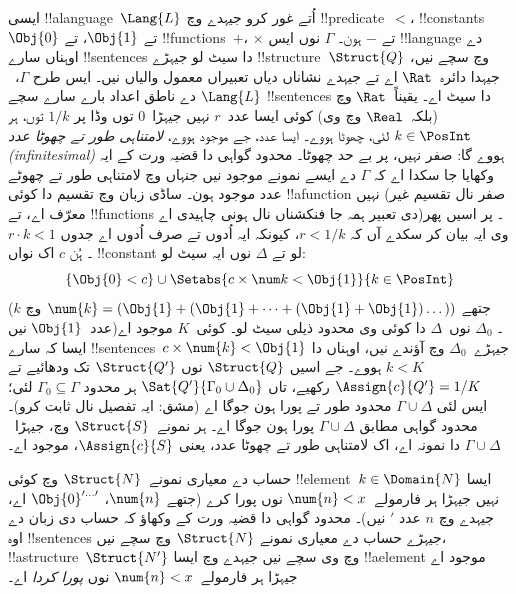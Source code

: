 \documentclass[../../../include/open-logic-section]{subfiles}
\begin{document}
{\begin{ex}
ایسی !!a{language}~$\Lang{L}$ اُتے غور کرو جیہدے
وچ !!{predicate}~$<$، !!{constant}s~$\Obj{0}$ تے
$\Obj{1}$، تے !!{function}s~$+$، $\times$ تے
$-$ ہون۔ $\Gamma$ نوں ایس !!{language} دے اوہناں
سارے !!{sentence}s دا سیٹ لو جیہڑے
!!{structure}~$\Struct{Q}$ وچ سچے نیں،
جیہدا دائرہ~$\Rat$ اے تے جیہدے نشاناں دیاں
تعبیراں معمول والیاں نیں۔ ایس طرح
$\Gamma$،~$\Lang{L}$ دے ناطق اعداد بارے
سارے سچے !!{sentence}s دا سیٹ اے۔
یقیناً~$\Rat$ وچ (بلکہ~$\Real$ وچ وی)
کوئی ایسا عدد~$r$ نہیں جیہڑا~$0$ توں وڈا
پر $1/k$ توں، ہر $k \in \PosInt$ لئی،
چھوٹا ہووے۔ ایسا عدد، جے موجود ہووے،
\emph{لامتناہی طور تے چھوٹا عدد (infinitesimal)}
ہووے گا: صفر نہیں، پر بے حد چھوٹا۔
محدود گواہی دا قضیہ ورت کے ایہ وکھایا
جا سکدا اے کہ $\Gamma$ دے ایسے نمونے
موجود نیں جنہاں وچ لامتناہی طور تے
چھوٹے عدد موجود ہون۔ ساڈی زبان وچ
تقسیم دا کوئی !!a{function} نہیں (صفر
نال تقسیم غیر معرّف اے، تے !!{function}s
دی تعبیر ہمہ جا فنکشناں نال ہونی چاہیدی
اے)۔ پر اسیں پھر وی ایہ بیان کر سکدے
آں کہ $r < 1/k$، کیونکہ ایہ اُدوں تے
صرف اُدوں اے جدوں $r \cdot k < 1$۔
ہُن $c$ اک نواں !!{constant} لو تے
$\Delta$ نوں ایہ سیٹ لو:
\[
\{\Obj{0} < c\}
\cup \Setabs{ c \times \num k < \Obj{1} }{k \in \PosInt}
\]
(جتھے $\num{k} = (\Obj{1} + (\Obj{1} + \dots + (\Obj{1} +
\Obj{1})\dots))$ وچ $k$ عدد~$\Obj{1}$ نیں)۔
$\Delta_0$ نوں~$\Delta$ دا کوئی وی محدود ذیلی سیٹ
لو۔ کوئی~$K$ موجود اے ایسا کہ سارے
!!{sentence}s~$c \times \num{k} < \Obj{1}$
جیہڑے~$\Delta_0$ وچ آؤندے نیں،
اوہناں دا $k < K$ ہووے۔ جے اسیں $\Struct{Q}$ نوں
$\Struct{Q'}$ تک ودھائیے تے
$\Assign{c}{Q'} = 1/K$ رکھیے،
تاں $\Sat{Q'}{\Gamma_0 \cup \Delta_0}$
ہر محدود $\Gamma_0 \subseteq \Gamma$ لئی؛
ایس لئی $\Gamma \cup \Delta$ محدود
طور تے پورا ہون جوگا اے (مشق:
ایہ تفصیل نال ثابت کرو)۔ محدود گواہی
مطابق $\Gamma \cup \Delta$ پورا ہون
جوگا اے۔ ہر نمونے~$\Struct{S}$ وچ،
جیہڑا~$\Gamma \cup \Delta$ دا نمونہ اے، اک
لامتناہی طور تے چھوٹا عدد، یعنی
$\Assign{c}{S}$، موجود اے۔
\end{ex}
}{}

\begin{prob}
حساب دے معیاری نمونے~$\Struct{N}$
وچ کوئی !!{element}~$k \in \Domain{N}$
ایسا نہیں جیہڑا ہر فارمولے~$\num{n}
< x$ نوں پورا کرے (جتھے $\num{n}$،
$\Obj{0}^{\prime\dots\prime}$ اے،
جیہدے وچ $n$ عدد $\prime$ نیں)۔
محدود گواہی دا قضیہ ورت کے وکھاؤ کہ
حساب دی زبان دے اوہ !!{sentence}s
جیہڑے حساب دے معیاری نمونے
$\Struct{N}$ وچ سچے نیں،
!!a{structure}~$\Struct{N'}$ وچ
وی سچے نیں جیہدے وچ ایسا
!!a{element} موجود اے جیہڑا
ہر فارمولے~$\num{n} < x$
نوں \emph{پورا کردا} اے۔
\end{prob}
\tagendprob
\end{document}
